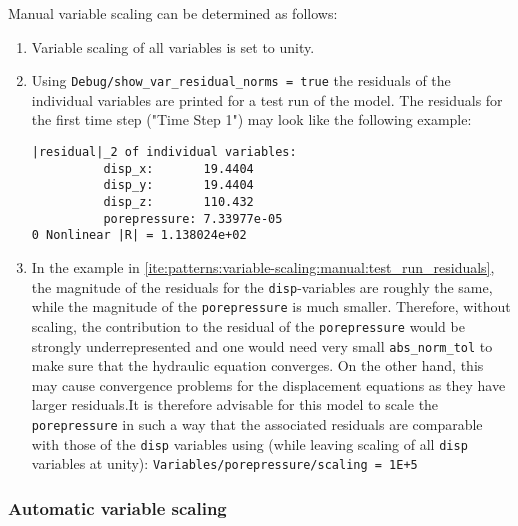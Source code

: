 Manual variable scaling can be determined as follows:
\begin{enumerate}
  \item Variable scaling of all variables is set to unity.
  \item\label{ite:patterns:variable-scaling:manual:test_run_residuals} {Using
          \texttt{Debug/show\_var\_residual\_norms = true} the residuals of the
          individual variables are printed for a test run of the model. The residuals for
          the first time step ("Time Step 1") may look like the following example:
          \vspace{0.1cm}\begin{mdframed}[leftmargin=0.1cm,innerleftmargin=0.1cm,topline=false,rightline=false,bottomline=false]
            \begin{verbatim}
|residual|_2 of individual variables:
          disp_x:       19.4404
          disp_y:       19.4404
          disp_z:       110.432
          porepressure: 7.33977e-05
0 Nonlinear |R| = 1.138024e+02\end{verbatim}
          \end{mdframed}}
  \item In the example in
        \autoref{ite:patterns:variable-scaling:manual:test_run_residuals}, the
        magnitude of the residuals for the \texttt{disp}-variables are roughly the
        same, while the magnitude of the \texttt{porepressure} is much smaller.
        Therefore, without scaling, the contribution to the residual of the
        \texttt{porepressure} would be strongly underrepresented and one would need
        very small \texttt{abs\_norm\_tol} to make sure that the hydraulic equation
        converges. On the other hand, this may cause convergence problems for the
        displacement equations as they have larger residuals.\newline It is therefore
        advisable for this model to scale the \texttt{porepressure} in such a way that
        the associated residuals are comparable with those of the \texttt{disp}
        variables using (while leaving scaling of all \texttt{disp} variables at
        unity): \texttt{Variables/porepressure/scaling = 1E+5}

\end{enumerate}

\subsubsection{Automatic variable scaling}

